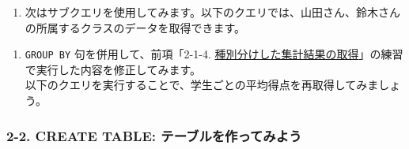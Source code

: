 \begin{enumerate}
\def\labelenumi{\arabic{enumi}.}
\setcounter{enumi}{3}
\tightlist
\item
  次はサブクエリを使用してみます。以下のクエリでは、山田さん、鈴木さんの所属するクラスのデータを取得できます。
\end{enumerate}

\begin{Shaded}
\begin{Highlighting}[]
 \OperatorTok{*} 
  \NormalTok{ (}
    \NormalTok{ (}\NormalTok{, }\NormalTok{)}
\NormalTok{);}
\end{Highlighting}
\end{Shaded}

\begin{enumerate}
\def\labelenumi{\arabic{enumi}.}
\setcounter{enumi}{4}
\tightlist
\item
  \texttt{GROUP\ BY} 句を併用して、前項「2-1-4.
  \hyperref[2-1-4-ux7a2eux5225ux5206ux3051ux3057ux305fux96c6ux8a08ux7d50ux679cux306eux53d6ux5f97]{種別分けした集計結果の取得}」の練習で実行した内容を修正してみます。\\
  以下のクエリを実行することで、学生ごとの平均得点を再取得してみましょう。
\end{enumerate}

\begin{Shaded}
\begin{Highlighting}[]
 \OperatorTok{=}
 \NormalTok{;}
\end{Highlighting}
\end{Shaded}

\subsubsection{2-2. CREATE TABLE:
テーブルを作ってみよう}\label{create-table-ux30c6ux30fcux30d6ux30ebux3092ux4f5cux3063ux3066ux307fux3088ux3046}

